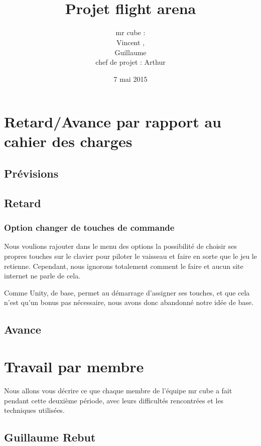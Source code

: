 \documentclass[10pt, titlepage]{report}
\title{\bsc{Rapport de la deuxième soutenance}\\Projet flight arena}
\author{mr cube :\\
Vincent \bsc{Rospini-Clerici},\\
Guillaume \bsc{Rebut}\\
chef de projet : Arthur \bsc{Remaud}}
\date{7 mai 2015}
\begin{document}
\maketitle
\renewcommand{\contentsname}{Sommaire}
\renewcommand{\chaptername}{Partie}

\tableofcontents

\chapter{Retard/Avance par rapport au cahier des charges}

\section{Prévisions}

\section{Retard}

\subsection{Option changer de touches de commande}

Nous voulions rajouter dans le menu des options la possibilité de choisir ses propres touches sur le clavier pour piloter le vaisseau et faire en sorte que le jeu le retienne. Cependant, nous ignorons totalement comment le faire et aucun site internet ne parle de cela.

Comme Unity, de base, permet au démarrage d'assigner ses touches, et que cela n'est qu'un bonus pas nécessaire, nous avons donc abandonné notre idée de base.\\

\section{Avance}

\chapter{Travail par membre}
Nous allons vous décrire ce que chaque membre de l'équipe mr cube a fait pendant cette deuxième période, avec leurs difficultés rencontrées et les techniques utilisées.

\section{Guillaume Rebut}
\end{document}
